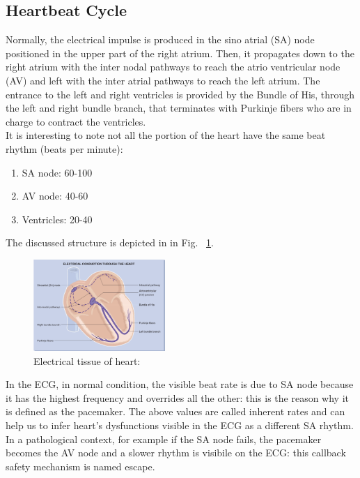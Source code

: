 \documentclass[LaM,binding=0.6cm]{sapthesis}
\begin{document}
\subsection{Heartbeat Cycle}
Normally, the electrical impulse is produced in the sino atrial (SA) node positioned in the upper part of the right atrium. Then, it propagates down to the right atrium with the inter nodal pathways to reach the atrio ventricular node (AV) and left with  the inter atrial pathways to reach the left atrium. The entrance to the left and right ventricles is provided by the Bundle of His, through the left and right bundle branch, that terminates with Purkinje fibers who are in charge to contract the ventricles.\\It is interesting to note not all the portion of the heart have the same beat rhythm (beats per minute):
\begin{enumerate}
\item SA node: 60-100  
\item AV node: 40-60 
\item Ventricles: 20-40 
\end{enumerate}
The discussed structure is depicted in in Fig. ~\ref{fig:hearts}.
\begin{figure}
	\includegraphics[width=50mm,scale=0.7]{heartex}
	\caption{Electrical tissue of heart: \cite{ecgbook}}
	\label{fig:hearts}
\end{figure}
In the ECG, in normal condition, the visible beat rate is due to SA node because it has the highest frequency and overrides all the other: this is the reason why it is defined as the pacemaker.
The above values are called inherent rates and can help us to infer heart's dysfunctions visible in the ECG as a different SA rhythm. In a pathological context, for example if the SA node fails, the pacemaker becomes the AV node and  a slower rhythm is visibile on the ECG: this callback safety mechanism is named escape.
\end{document}
